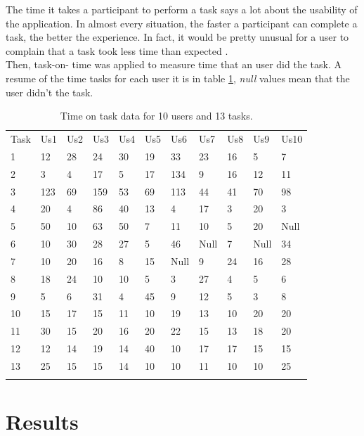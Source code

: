 The time it takes a participant to perform a task says a lot about the
usability of the application. In almost every situation, the faster a
participant can complete a task, the better the experience. In fact,
it would be pretty unusual for a user to complain that a task took
less time than expected \cite{albert2013measuring}.\\ Then, task-on-
time was applied to measure time that an user did the task. A resume
of the time tasks for each user it is in table \ref{tab:datausers},
\textit{null} values mean that the user didn't the task.
\begin{table}
\centering
\small
\captionsetup{font=footnotesize}
\caption{Time on task data for 10 users and 13 tasks. }
\label{tab:datausers}  
\begin{tabular}{lllllllllll}
\hline\noalign{\smallskip}
Task  & Us1  & Us2 & Us3 & Us4 & Us5 & Us6 & Us7 & Us8 & Us9 & Us10 \\
\noalign{\smallskip}\hline\noalign{\smallskip}
1 & 12  & 28 & 24 & 30 & 19 & 33  & 23 & 16 & 5  & 7 \\
2 & 3   & 4  & 17 & 5  & 17 & 134 & 9  & 16 & 12 & 11 \\
3 & 123 & 69 & 159& 53 & 69 & 113 & 44 & 41 & 70 & 98 \\
4 & 20  & 4  & 86 & 40 & 13 & 4   & 17 & 3  & 20 & 3 \\
5 & 50  & 10 & 63 & 50 & 7  & 11  & 10 & 5  & 20 & Null \\
6 & 10  & 30 & 28 & 27 & 5  & 46  & Null  & 7  & Null  & 34 \\
7 & 10  & 20 & 16 & 8  & 15 & Null & 9  & 24 & 16 & 28 \\
8 & 18  & 24 & 10 & 10 & 5  & 3   & 27 & 4  & 5  & 6 \\
9 & 5   & 6  & 31 & 4  & 45 & 9   & 12 & 5  & 3  & 8 \\
10 & 15 & 17 & 15 & 11 & 10 & 19  & 13 & 10 & 20 & 20 \\
11 & 30 & 15 & 20 & 16 & 20 & 22  & 15 & 13 & 18 & 20 \\
12 & 12 & 14 & 19 & 14 & 40 & 10  & 17 & 17 & 15 & 15 \\
13 & 25 & 15 & 15 & 14 & 10 & 10  & 11 & 10 & 10 & 25 \\
\noalign{\smallskip}\hline
\end{tabular}
\end{table}

\section{Results}

